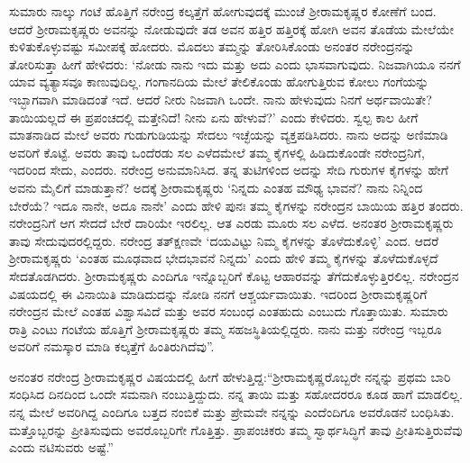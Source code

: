ಸುಮಾರು ನಾಲ್ಕು ಗಂಟೆ ಹೊತ್ತಿಗೆ ನರೇಂದ್ರ ಕಲ್ಕತ್ತೆಗೆ ಹೋಗುವುದಕ್ಕೆ ಮುಂಚೆ ಶ‍್ರೀರಾಮಕೃಷ್ಣರ ಕೋಣೆಗೆ ಬಂದ. ಆದರೆ ಶ‍್ರೀರಾಮಕೃಷ್ಣರು ಅವನನ್ನು ನೋಡುವುದೇ ತಡ ಅವನ ಹತ್ತಿರ ಹತ್ತಿರಕ್ಕೆ ಹೋಗಿ ಅವನ ತೊಡೆಯ ಮೇಲೆಯೇ ಕುಳಿತುಕೊಳ್ಳುವಷ್ಟು ಸಮೀಪಕ್ಕೆ ಹೋದರು. ಮೊದಲು ತಮ್ಮನ್ನು ತೋರಿಸಿಕೊಂಡು ಅನಂತರ ನರೇಂದ್ರನನ್ನು ತೋರಿಸುತ್ತಾ ಹೀಗೆ ಹೇಳಿದರು: ‘ನೋಡು ನಾನು ಇದು ಮತ್ತು ಅದು ಎಂದು ಭಾಸವಾಗುವುದು. ನಿಜವಾಗಿಯೂ ನನಗೆ ಯಾವ ವ್ಯತ್ಯಾಸವೂ ಕಾಣುವುದಿಲ್ಲ. ಗಂಗಾನದಿಯ ಮೇಲೆ ತೇಲಿಕೊಂಡು ಹೋಗುತ್ತಿರುವ ಕೋಲು ಗಂಗೆಯನ್ನು ಇಬ್ಭಾಗವಾಗಿ ಮಾಡಿದಂತೆ ಇದೆ. ಆದರೆ ನೀರು ನಿಜವಾಗಿ ಒಂದೇ. ನಾನು ಹೇಳುವುದು ನಿನಗೆ ಅರ್ಥವಾಯಿತೇ? ತಾಯಿಯಲ್ಲದೆ ಈ ಪ್ರಪಂಚದಲ್ಲಿ ಮತ್ತೇನಿದೆ! ನೀನು ಏನು ಹೇಳುವೆ?’ ಎಂದು ಕೇಳಿದರು. ಸ್ವಲ್ಪ ಕಾಲ ಹೀಗೆ ಮಾತನಾಡಿದ ಮೇಲೆ ಅವರು ಗುಡುಗುಡಿಯನ್ನು ಸೇದಲು ಇಚ್ಛೆಯನ್ನು ವ್ಯಕ್ತಪಡಿಸಿದರು. ನಾನು ಅದನ್ನು ಅಣಿಮಾಡಿ ಅವರಿಗೆ ಕೊಟ್ಟೆ. ಅವರು ತಾವು ಒಂದೆರಡು ಸಲ ಎಳೆದಮೇಲೆ ತಮ್ಮ ಕೈಗಳಲ್ಲಿ ಹಿಡಿದುಕೊಂಡೇ ನರೇಂದ್ರನಿಗೆ, ಇದರಿಂದ ಸೇದು, ಎಂದರು. ನರೇಂದ್ರ ಅನುಮಾನಿಸಿದ. ತನ್ನ ತುಟಿಗಳಿಂದ ಅದನ್ನು ಸೇದಿ ಗುರುಗಳ ಕೈಗಳನ್ನು ಹೇಗೆ ಅವನು ಮೈಲಿಗೆ ಮಾಡುತ್ತಾನೆ? ಅದಕ್ಕೆ ಶ‍್ರೀರಾಮಕೃಷ್ಣರು ‘ನಿನ್ನದು ಎಂತಹ ಮೌಢ್ಯ ಭಾವನೆ? ನಾನು ನಿನ್ನಿಂದ ಬೇರೆಯೆ? ಇದೂ ನಾನೇ, ಅದೂ ನಾನೇ’ ಎಂದು ಹೇಳಿ ಪುನಃ ತಮ್ಮ ಕೈಗಳನ್ನು ನರೇಂದ್ರನ ಬಾಯಿಯ ಹತ್ತಿರ ತಂದರು. ನರೇಂದ್ರನಿಗೆ ಆಗ ಸೇದದೆ ಬೇರೆ ದಾರಿಯೇ ಇರಲಿಲ್ಲ. ಆತ ಎರಡು ಮೂರು ಸಲ ಎಳೆದ. ಅನಂತರ ಶ‍್ರೀರಾಮಕೃಷ್ಣರು ತಾವು ಸೇದುವುದರಲ್ಲಿದ್ದರು. ನರೇಂದ್ರ ತತ್‍ಕ್ಷಣವೇ ‘ದಯವಿಟ್ಟು ನಿಮ್ಮ ಕೈಗಳನ್ನು ತೊಳೆದುಕೊಳ್ಳಿ’ ಎಂದ. ಆದರೆ ಶ‍್ರೀರಾಮಕೃಷ್ಣರು ‘ಎಂತಹ ಮೂಢವಾದ ಭೇದಭಾವನೆ ನಿನ್ನದು’ ಎಂದು ಹೇಳಿ ತಮ್ಮ ಕೈಗಳನ್ನು ತೊಳೆದುಕೊಳ್ಳದೆ ಸೇದತೊಡಗಿದರು. ಶ‍್ರೀರಾಮಕೃಷ್ಣರು ಎಂದಿಗೂ ಇನ್ನೊಬ್ಬರಿಗೆ ಕೊಟ್ಟ ಆಹಾರವನ್ನು ತೆಗೆದುಕೊಳ್ಳುತ್ತಿರಲಿಲ್ಲ. ನರೇಂದ್ರನ ವಿಷಯದಲ್ಲಿ ಈ ವಿನಾಯಿತಿ ಮಾಡಿದುದನ್ನು ನೋಡಿ ನನಗೆ ಆಶ್ಚರ್ಯವಾಯಿತು. ಇದರಿಂದ ಶ‍್ರೀರಾಮಕೃಷ್ಣರಿಗೆ ನರೇಂದ್ರನ ಮೇಲೆ ಎಂತಹ ವಿಶ್ವಾಸವಿದೆ ಮತ್ತು ಅವರ ಸಂಬಂಧ ಎಂತಹುದು ಎಂಬುದು ಗೊತ್ತಾಯಿತು. ಸುಮಾರು ರಾತ್ರಿ ಎಂಟು ಗಂಟೆಯ ಹೊತ್ತಿಗೆ ಶ‍್ರೀರಾಮಕೃಷ್ಣರು ತಮ್ಮ ಸಹಜಸ್ಥಿತಿಯಲ್ಲಿದ್ದರು. ನಾನು ಮತ್ತು ನರೇಂದ್ರ ಇಬ್ಬರೂ ಅವರಿಗೆ ನಮಸ್ಕಾರ ಮಾಡಿ ಕಲ್ಕತ್ತೆಗೆ ಹಿಂತಿರುಗಿದೆವು”.

ಅನಂತರ ನರೇಂದ್ರ ಶ‍್ರೀರಾಮಕೃಷ್ಣರ ವಿಷಯದಲ್ಲಿ ಹೀಗೆ ಹೇಳುತ್ತಿದ್ದ:\break “ಶ‍್ರೀರಾಮಕೃಷ್ಣ\-ರೊಬ್ಬರೇ ನನ್ನನ್ನು ಪ್ರಥಮ ಬಾರಿ ಸಂಧಿಸಿದ ದಿನದಿಂದ ಒಂದೇ ಸಮನಾಗಿ ನಂಬುತ್ತಿದ್ದುದು. ನನ್ನ ತಾಯಿ ಮತ್ತು ಸಹೋದರರೂ ಕೂಡ ಹಾಗೆ ಮಾಡಲಿಲ್ಲ. ನನ್ನ ಮೇಲೆ ಅವರಿಗಿದ್ದ ಎಂದಿಗೂ ಬತ್ತದ ನಂಬಿಕೆ ಮತ್ತು ಪ್ರೇಮವೇ ನನ್ನನ್ನು ಎಂದೆಂದಿಗೂ ಅವರೊಡನೆ ಬಂಧಿಸಿತು. ಮತ್ತೊಬ್ಬರನ್ನು ಪ್ರೀತಿಸುವುದು ಅವರೊಬ್ಬರಿಗೇ ಗೊತ್ತಿತ್ತು. ಪ್ರಾಪಂಚಿಕರು ತಮ್ಮ ಸ್ವಾರ್ಥಸಿದ್ಧಿಗೆ ತಾವು ಪ್ರೀತಿಸುತ್ತಿರುವೆವು ಎಂದು ನಟಿಸುವರು ಅಷ್ಟೆ.”

